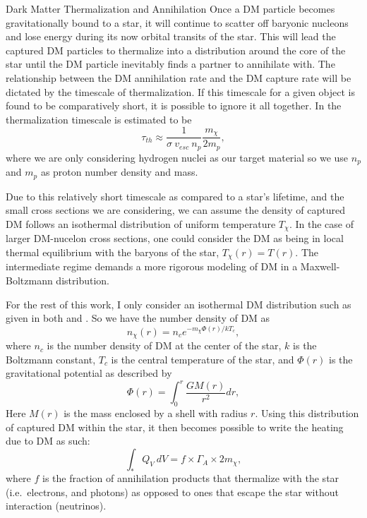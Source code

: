 \documentclass[a4paper,11pt]{article}
\begin{document}
\begin{section}{Dark Matter Thermalization and Annihilation}
    Once a DM particle becomes gravitationally bound to a star, it will continue to scatter off baryonic nucleons and lose energy during its now orbital transits of the star. 
    This will lead the captured DM particles to thermalize into a distribution around the core of the star until the DM particle inevitably finds a partner to annihilate with.
    The relationship between the DM annihilation rate and the DM capture rate will be dictated by the timescale of thermalization.
    If this timescale for a given object is found to be comparatively short, it is possible to ignore it all together.
    In \cite{Freese:2008cap} the thermalization timescale is estimated to be
    \begin{equation}
    \tau_{th} \approx \frac{1}{\sigma~ v_{esc}~ n_p} \frac{m_{\chi}}{2 m_p},
    \end{equation}
    where we are only considering hydrogen nuclei as our target material so we use $n_p$ and $m_p$ as proton number density and mass.

    Due to this relatively short timescale as compared to a star's lifetime, and the small cross sections we are considering, we can assume the density of captured DM follows an isothermal distribution of uniform temperature $T_{\chi}$.
    In the case of larger DM-nucelon cross sections, one could consider the DM as being in local thermal equilibrium with the baryons of the star, $T_{\chi}(r) = T(r)$.
    The intermediate regime demands a more rigorous modeling of DM in a Maxwell-Boltzmann distribution.

    For the rest of this work, I only consider an isothermal DM distribution such as given in both \cite{Freese:2008cap} and \cite{Garani:2017}. So we have the number density of DM as
    \begin{equation}
        n_{\chi}(r) =  n_{c} e^{-m_{\chi} \Phi(r)/kT_c },
        \label{nchi}
    \end{equation}
    where $n_{c}$ is the number density of DM at the center of the star, $k$ is the Boltzmann constant, $T_c$ is the central temperature of the star, and $\Phi(r)$ is the gravitational potential as described by
    \begin{equation}
    \Phi(r) = \int_{0}^{r} \frac{GM(r)}{r^2} dr,
    \end{equation}
    Here $M(r)$ is the mass enclosed by a shell with radius $r$.
    Using this distribution of captured DM within the star, it then becomes possible to write the heating due to DM as such:
    \begin{equation}
        \int_{*} Q_{V} ~ dV  = f \times \Gamma_A \times 2 m_{\chi} ,
    \end{equation}
    where $f$ is the fraction of annihilation products that thermalize with the star (i.e.~electrons, and photons) as opposed to ones that escape the star without interaction (neutrinos). 


\end{section}
\end{document}
